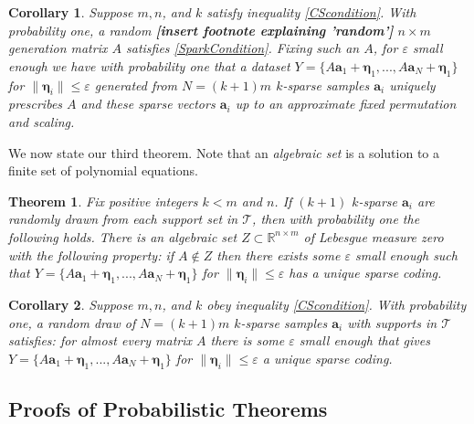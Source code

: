 \documentclass[journal, onecolumn]{IEEEtran}
\newtheorem{theorem}{Theorem}
\newtheorem{corollary}{Corollary}
\begin{document}
\begin{corollary}
Suppose $m, n$, and $k$ satisfy inequality \eqref{CScondition}. With probability one, a random \textbf{[insert footnote explaining 'random']} $n \times m$ generation matrix $A$ satisfies \eqref{SparkCondition}. Fixing   such an $A$, for $\varepsilon$ small enough we have with probability one that a dataset $Y = \{A\mathbf{a}_1 + \mathbf{\eta}_1, . . . , A\mathbf{a}_N + \mathbf{\eta}_1 \}$ for $\|\mathbf{\eta}_i\| \leq \varepsilon$ generated from $N = (k + 1)m$ $k$-sparse samples $\mathbf{a}_i$ uniquely prescribes $A$ and these sparse vectors $\mathbf{a}_i$ up to an approximate fixed permutation and scaling.
\end{corollary}

We now state our third theorem. Note that an \emph{algebraic set} is a solution to a finite set of polynomial equations. 

\begin{theorem}\label{Theorem3}
Fix positive integers $k < m$ and $n$. If $(k + 1)$ $k$-sparse $\mathbf{a}_i$ are randomly drawn from each support set in $\mathcal{T}$, then with probability one the following holds. There is an algebraic set $Z \subset \mathbb{R}^{n \times m}$ of Lebesgue measure zero with the following property: if $A \notin Z$ then there exists some $\varepsilon$ small enough such that $Y = \{A\mathbf{a}_1 + \mathbf{\eta}_1, . . . , A\mathbf{a}_N + \mathbf{\eta}_1 \}$ for $\|\mathbf{\eta}_i\| \leq \varepsilon$ has a unique sparse coding.
\end{theorem}

\begin{corollary}
Suppose $m, n$, and $k$ obey inequality \eqref{CScondition}. With probability one, a random draw of $N = (k + 1)m$ $k$-sparse samples $\mathbf{a}_i$ with supports in $\mathcal{T}$ satisfies: for almost every matrix $A$ there is some $\varepsilon$ small enough that gives $Y = \{A\mathbf{a}_1 + \mathbf{\eta}_1, . . . , A\mathbf{a}_N + \mathbf{\eta}_1 \}$ for $\|\mathbf{\eta}_i\| \leq \varepsilon$ a unique sparse coding.
\end{corollary}


\subsection{Proofs of Probabilistic Theorems}\label{PUTproof}
\end{document}
